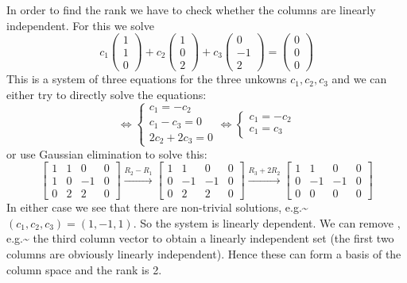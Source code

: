 \documentclass[
  a4paper,
  DIV=11,
  numbers=noendperiod,
  oneside]{scrreprt}
\theoremstyle{definition}
\theoremstyle{remark}
\newenvironment{fbx}[3]{\begin{tcolorbox}[enhanced, breakable,%
attach boxed title to top*={xshift=1.4pt},
boxed title style={boxrule=0.0mm, fuzzy shadow={1pt}{-1pt}{0mm}{0.1mm}{gray}, arc=.3em, rounded corners=east, sharp corners=west}, colframe=#1-color2, colbacktitle=#1-color1, colback = white, coltitle=black,  titlerule=0mm, toprule=0pt, bottomrule=.7pt, leftrule=.3em, rightrule=0pt, outer arc=.3em,  arc=0pt,	 sharp corners = east, left=.5em, bottomtitle=1mm, toptitle=1mm,title=\textbf{#2}\hspace{0.5em}{#3}]}
{\end{tcolorbox}}
\begin{document}
\label{Solutionux2a-3.8}
\begin{fbx}{Solution}{Solution}{}
\label{Solution*-3.8}
In order to find the rank we have to check whether the columns are
linearly independent. For this we solve
\[c_1 \begin{pmatrix} 1 \\ 1 \\ 0  \end{pmatrix}+ c_2 \begin{pmatrix} 1 \\ 0 \\ 2  \end{pmatrix} + c_3 \begin{pmatrix} 0 \\ -1 \\ 2  \end{pmatrix} = \begin{pmatrix} 0 \\ 0 \\ 0  \end{pmatrix} \]
This is a system of three equations for the three unkowns
\(c_1,c_2,c_3\) and we can either try to directly solve the equations:
\[ \Leftrightarrow \left\{\begin{array}{l}
 c_1  = - c_2 \\
 c_1 - c_3=0 \\
 2 c_2 + 2 c_3 =0
        \end{array}  \right.    \Leftrightarrow  \left\{ \begin{array}{l}
 c_1 = - c_2  \\
 c_1 = c_3 
        \end{array}  \right. \] or use Gaussian elimination to solve
this:
\[\left[\begin{array}{ccc|c} 1 & 1 & 0 & 0\\ 1 & 0 & -1 & 0 \\ 0 & 2 & 2 & 0\end{array}\right] \xrightarrow{R_2 - R_1} \left[\begin{array}{ccc|c} 1 & 1 & 0 & 0\\ 0 & -1 & -1 & 0\\ 0 & 2 & 2 & 0 \end{array}\right] \xrightarrow{R_3 + 2R_2} \left[\begin{array}{ccc|c} 1 & 1 & 0 & 0 \\ 0 & -1 & -1 & 0\\ 0 & 0 & 0 & 0 \end{array}\right]\]
In either case we see that there are non-trivial solutions,
e.g.\textasciitilde{}\((c_1,c_2,c_3)=(1,-1,1)\). So the system is
linearly dependent. We can remove , e.g.\textasciitilde{} the third
column vector to obtain a linearly independent set (the first two
columns are obviously linearly independent). Hence these can form a
basis of the column space and the rank is 2.


\end{fbx}
\end{document}
